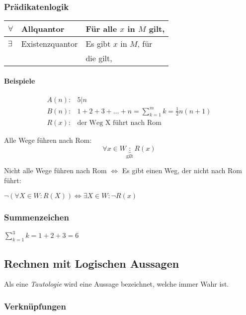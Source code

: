 \begin{multicols}{2}
\subsubsection{Prädikatenlogik}
	\begin{tabular}{| l | l | l |}
		\hline
		$\forall$ & Allquantor & Für alle $x$ in $M$ gilt, \\ \hline
		$\exists$ & Existenzquantor &
		Es gibt $x$ in $M$, für \\
		& & die gilt, \\
		\hline
	\end{tabular}

	\paragraph{Beispiele}
		\begin{align*}
		A(n): & 5 | n \\
		B(n): & 1+2+3+\dots+n = \sum_{k=1}^{m}k = \frac{1}{2} n (n+1) \\
		R(x): & \text{der Weg X führt nach Rom}
		\end{align*}
		
		Alle Wege führen nach Rom:
		\[
		\forall x \in W \underbracket{:}_\text{gilt} R(x)
		\]
		
		Nicht alle Wege führen nach Rom $\Leftrightarrow$ Es gibt einen Weg, der nicht nach Rom führt:
		
		$\neg \left(\forall X \in W : R\left(X\right)\right) \Leftrightarrow \exists X \in W : \neg R(x)$
	

\subsubsection{Summenzeichen}

	$ \sum_{k=1}^{3} k = 1+2+3 = 6$

\subsection{Rechnen mit Logischen Aussagen}

Als eine \emph{Tautologie} wird eine Aussage bezeichnet, welche immer Wahr ist.

	
\subsubsection{Verknüpfungen}

	\begin{description}


\end{description}
\end{multicols}
